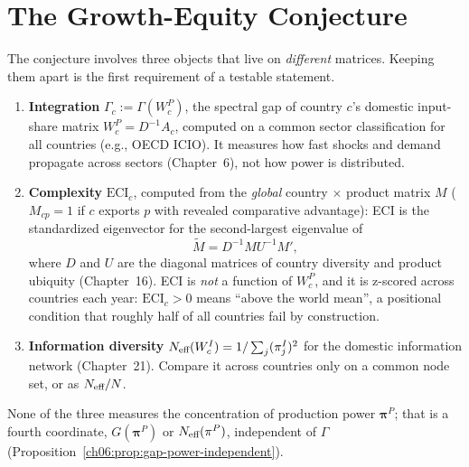\documentclass[../structural_economics_book.tex]{subfiles}
\begin{document}
\section{The Growth-Equity Conjecture}
\label{ch26:sec:theorem}

The conjecture involves three objects that live on \emph{different} matrices. Keeping them apart is the first requirement of a testable statement.
\begin{enumerate}
\item \textbf{Integration} $\Gamma_c := \Gamma(W^P_c)$, the spectral gap of country $c$'s domestic input-share matrix $W^P_c = D^{-1}A_c$, computed on a common sector classification for all countries (e.g., OECD ICIO). It measures how fast shocks and demand propagate across sectors (Chapter~6), not how power is distributed.
\item \textbf{Complexity} $\text{ECI}_c$, computed from the \emph{global} country $\times$ product matrix $M$ ($M_{cp} = 1$ if $c$ exports $p$ with revealed comparative advantage): ECI is the standardized eigenvector for the second-largest eigenvalue of
\[
\tilde{M} = D^{-1}MU^{-1}M',
\]
where $D$ and $U$ are the diagonal matrices of country diversity and product ubiquity (Chapter~16). ECI is \emph{not} a function of $W^P_c$, and it is z-scored across countries each year: $\text{ECI}_c > 0$ means ``above the world mean'', a positional condition that roughly half of all countries fail by construction.
\item \textbf{Information diversity} $N_{\text{eff}}(W^I_c) = 1/\sum_j(\pi^I_j)^2$ for the domestic information network (Chapter~21). Compare it across countries only on a common node set, or as $N_{\text{eff}}/N$.
\end{enumerate}
None of the three measures the concentration of production power $\boldsymbol{\pi}^P$; that is a fourth coordinate, $G(\boldsymbol{\pi}^P)$ or $N_{\text{eff}}(\pi^P)$, independent of $\Gamma$ (Proposition~\ref{ch06:prop:gap-power-independent}).
\end{document}
